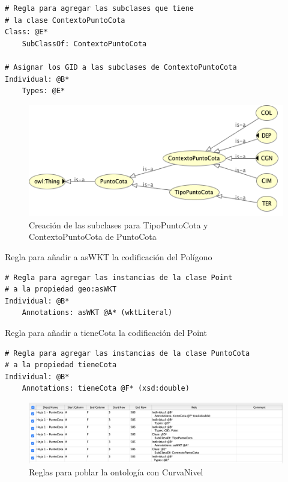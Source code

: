 
\begin{lstlisting}
# Regla para agregar las subclases que tiene 
# la clase ContextoPuntoCota 
Class: @E*
	SubClassOf: ContextoPuntoCota

# Asignar los GID a las subclases de ContextoPuntoCota
Individual: @B*
	Types: @E*
\end{lstlisting}

\begin{figure}[H]
	\centering
	\includegraphics[width=0.7\linewidth]{imagenes/capitulo5/puntocota-1}
	\caption{Creación de las subclases para TipoPuntoCota y ContextoPuntoCota de PuntoCota}
	\label{fig:puntocota-1}
\end{figure}

Regla para añadir a asWKT la codificación del Polígono

\begin{lstlisting}
# Regla para agregar las instancias de la clase Point
# a la propiedad geo:asWKT 
Individual: @B*
	Annotations: asWKT @A* (wktLiteral)
\end{lstlisting}


Regla para añadir a tieneCota la codificación del Point

\begin{lstlisting}
# Regla para agregar las instancias de la clase PuntoCota
# a la propiedad tieneCota
Individual: @B*
	Annotations: tieneCota @F* (xsd:double)
\end{lstlisting}

\begin{figure}
	\centering
	\includegraphics[width=0.9\linewidth]{imagenes/capitulo5/reglas-puntocota}
	\caption{Reglas para poblar la ontología con CurvaNivel}
	\label{fig:reglas-puntocota}
\end{figure}

